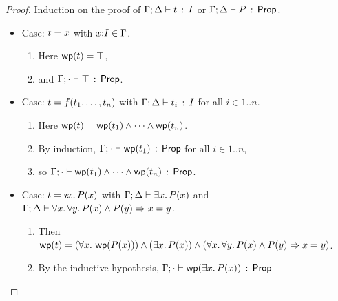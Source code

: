 \documentclass[10pt,a4paper]{article}
\begin{document}
\begin{proof}
  \raggedright Induction on the proof of
  $\Gamma;\Delta \vdash t\, :\, I$ or $\Gamma;\Delta \vdash P\, :\, \mathsf{Prop}$.
  \begin{itemize}
  \item Case: $t = x$ with $x{:}I\in\Gamma$.  
    \begin{enumerate}
      \item
        Here $\mathop{\mathsf{wp}}(t) = \top$,
      \item
        and $\Gamma;\cdot \vdash \top\, :\, \mathsf{Prop}$. 
      \end{enumerate}
  \item Case: $t = f({t}_1,\ldots,{t}_{n})$ with
    $\Gamma;\Delta \vdash t_i\, :\, I$ for all $i\in1..n$.
    \begin{enumerate}
    \item
      Here $\mathop{\mathsf{wp}}(t) =
      \mathop{\mathsf{wp}}(t_1) \wedge \cdots \wedge \mathop{\mathsf{wp}}(t_n)$.
    \item 
    	By induction,
      $\Gamma;\cdot \vdash \mathop{\mathsf{wp}}(t_1)\, :\, \mathsf{Prop}$ for
      all $i\in1..n$, 
    \item 
    	so
    $\Gamma;\cdot \vdash \mathop{\mathsf{wp}}(t_1) \wedge \cdots \wedge \mathop{\mathsf{wp}}(t_n)\, :\, \mathsf{Prop}$.
    \end{enumerate}

\goodbreak        
  \item Case: $\t = \tDesc{\x}{\I}{\p(\x)}$ with
  $\Gamma;\Delta \vdash \exists x.\, P(x)$ and 
  $\Gamma;\Delta \vdash \forall x.\, \forall y.\, P(x) \wedge P(y) \Rightarrow x=y$.

    \begin{enumerate}
      \item 
        Then
        $\mathop{\mathsf{wp}}(t) = 
        (\forall x.\, \mathop{\mathsf{wp}}(P(x))) \wedge (\exists x.\, P(x)) \wedge (\forall x.\, \forall y.\, P(x) \wedge P(y) \Rightarrow x=y)$.
      \item 
        By the inductive hypothesis, $\Gamma;\cdot \vdash \mathop{\mathsf{wp}}(\exists x.\, P(x))\, :\, \mathsf{Prop}$
\bigskip


\end{enumerate}
\end{itemize}
\end{proof}
\end{document}
